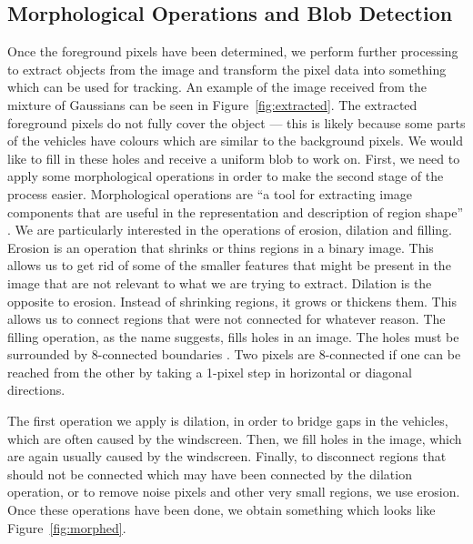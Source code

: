 \documentclass[conference]{IEEEtran}
\begin{document}
\subsection{Morphological Operations and Blob Detection}
Once the foreground pixels have been determined, we perform further processing
to extract objects from the image and transform the pixel data into something
which can be used for tracking. An example of the image received from the
mixture of Gaussians can be seen in Figure~\ref{fig:extracted}. The extracted
foreground pixels do not fully cover the object --- this is likely because some
parts of the vehicles have colours which are similar to the background
pixels. We would like to fill in these holes and receive a uniform blob to work
on. First, we need to apply some morphological operations in order to make the
second stage of the process easier. Morphological operations are ``a tool for
extracting image components that are useful in the representation and
description of region shape'' \cite{gonzalez2008digital}. We are particularly
interested in the operations of erosion, dilation and filling. Erosion is an
operation that shrinks or thins regions in a binary image. This allows us to get
rid of some of the smaller features that might be present in the image that are
not relevant to what we are trying to extract. Dilation is the opposite to
erosion. Instead of shrinking regions, it grows or thickens them. This allows us
to connect regions that were not connected for whatever reason. The filling
operation, as the name suggests, fills holes in an image. The holes must be
surrounded by 8-connected boundaries \cite{gonzalez2008digital}. Two pixels are
8-connected if one can be reached from the other by taking a 1-pixel step in
horizontal or diagonal directions.

The first operation we apply is dilation, in order to bridge gaps
in the vehicles, which are often caused by the windscreen. Then, we fill holes
in the image, which are again usually caused by the windscreen. Finally, to
disconnect regions that should not be connected which may have been connected by
the dilation operation, or to remove noise pixels and other very small regions,
we use erosion. Once these operations have been done, we obtain something which
looks like Figure~\ref{fig:morphed}.
\end{document}
